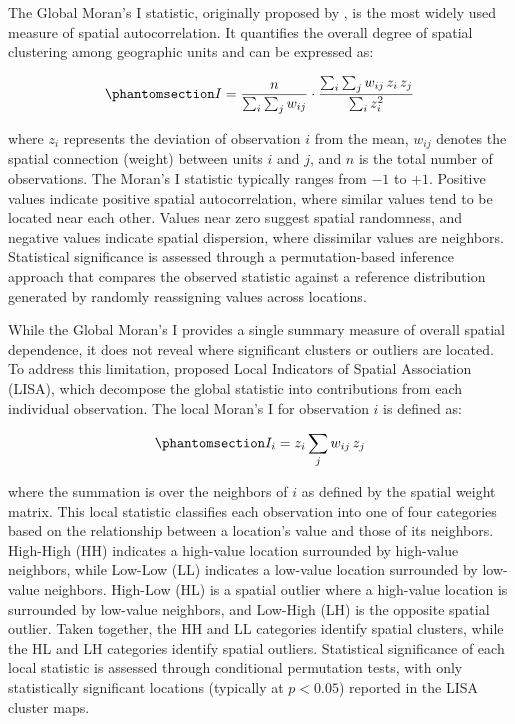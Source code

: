 \documentclass[
  a4paper, 
  twoside,
  review
]{article}
\begin{document}
The Global Moran's I statistic, originally proposed by
\citet{moran_spatial_autocorrelation}, is the most widely used measure
of spatial autocorrelation. It quantifies the overall degree of spatial
clustering among geographic units and can be expressed as:

\begin{equation}\phantomsection\label{eq-moran}{
I=\frac{n}{\sum_i \sum_j w_{ij}} \cdot \frac{\sum_i \sum_j w_{ij} \, z_i \, z_j}{\sum_i z_i^2}
}\end{equation}

where \(z_i\) represents the deviation of observation \(i\) from the
mean, \(w_{ij}\) denotes the spatial connection (weight) between units
\(i\) and \(j\), and \(n\) is the total number of observations. The
Moran's I statistic typically ranges from \(-1\) to \(+1\). Positive
values indicate positive spatial autocorrelation, where similar values
tend to be located near each other. Values near zero suggest spatial
randomness, and negative values indicate spatial dispersion, where
dissimilar values are neighbors. Statistical significance is assessed
through a permutation-based inference approach that compares the
observed statistic against a reference distribution generated by
randomly reassigning values across locations.

While the Global Moran's I provides a single summary measure of overall
spatial dependence, it does not reveal where significant clusters or
outliers are located. To address this limitation, \citet{anselin_lisa}
proposed Local Indicators of Spatial Association (LISA), which decompose
the global statistic into contributions from each individual
observation. The local Moran's I for observation \(i\) is defined as:

\begin{equation}\phantomsection\label{eq-lisa}{
I_i = z_i \sum_j w_{ij} \, z_j
}\end{equation}

where the summation is over the neighbors of \(i\) as defined by the
spatial weight matrix. This local statistic classifies each observation
into one of four categories based on the relationship between a
location's value and those of its neighbors. High-High (HH) indicates a
high-value location surrounded by high-value neighbors, while Low-Low
(LL) indicates a low-value location surrounded by low-value neighbors.
High-Low (HL) is a spatial outlier where a high-value location is
surrounded by low-value neighbors, and Low-High (LH) is the opposite
spatial outlier. Taken together, the HH and LL categories identify
spatial clusters, while the HL and LH categories identify spatial
outliers. Statistical significance of each local statistic is assessed
through conditional permutation tests, with only statistically
significant locations (typically at \(p < 0.05\)) reported in the LISA
cluster maps.
\end{document}
